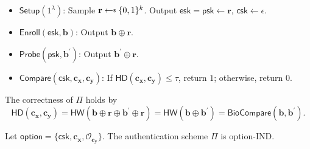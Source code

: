\begin{itemize}

	\item $\textsf{Setup} (1^\lambda)$: Sample $\mathbf{r} \getsdollar \{0, 1\}^k$. Output $\textsf{esk} = \textsf{psk} \gets \mathbf{r}$, $\textsf{csk} \gets \epsilon$.

	\item $\textsf{Enroll}(\textsf{esk}, \mathbf{b})$: Output $\mathbf{b} \oplus \mathbf{r}$.
	
	\item $\textsf{Probe}(\textsf{psk}, \mathbf{b}^\prime)$: Output $\mathbf{b}^\prime \oplus \mathbf{r}$.

	\item $\textsf{Compare} (\textsf{csk}, \mathbf{c_x}, \mathbf{c_y})$: If $\textsf{HD}(\mathbf{c_x}, \mathbf{c_y}) \leq \tau$, return $1$; otherwise, return $0$. 

\end{itemize}
The correctness of $\Pi$ holds by
\[
	\textsf{HD}(\mathbf{c_x}, \mathbf{c_y}) = \textsf{HW}(\mathbf{b} \oplus \mathbf{r} \oplus \mathbf{b}^\prime \oplus \mathbf{r}) = \textsf{HW}(\mathbf{b} \oplus \mathbf{b}^\prime) = \textsf{BioCompare}(\mathbf{b}, \mathbf{b}^\prime).
\]

\begin{theorem}
\label{thm:rh:ind:particular-biometri-layer}
Let $\textsf{option} = \{\textsf{csk}, \mathbf{c_x}, \mathcal{O}_{\mathbf{c_y}}\}$. The authentication scheme $\Pi$ is \textsf{option}-IND.

\end{theorem}

